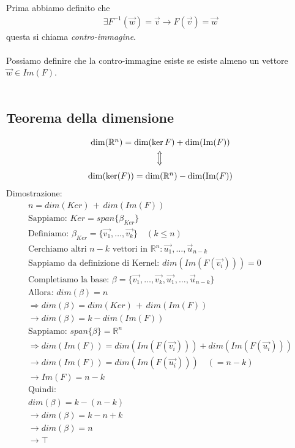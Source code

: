 \documentclass[10pt]{extarticle}
\begin{document}
Prima abbiamo definito che 
\begin{align*}
    \exists F^{-1}(\vec{w})=\vec{v} \to F(\vec{v})=\vec{w}
\end{align*}
questa si chiama \textit{contro-immagine}. \\
\vspace{1em} \\
Possiamo definire che la contro-immagine esiste se esiste almeno un vettore $\vec{w} \in Im(F)$. \\
\vspace{15em}\\
\subsection{Teorema della dimensione}
\[
\begin{array}{c}
    \dim(\mathbb{R}^n) = \dim(\ker F) + \dim(\operatorname{Im} (F)) \\
    \rotatebox{90}{$\iff$} \\
    \dim(\ker (F)) = \dim(\mathbb{R}^n) - \dim(\operatorname{Im} (F))
\end{array}
\]
Dimostrazione:
\begin{align*}
    n=dim(Ker) \, + \, dim(Im(F)) \\
    \text{Sappiamo: } Ker=span\{\beta_{Ker}\} \\
    \text{Definiamo: } \beta_{Ker}=\{\vec{v_1},\dots,\vec{v_k}\} \quad (k \leq n) \\
    \text{Cerchiamo altri $n-k$ vettori in $\mathbb{R}^n$}: \vec{u_1},\dots,\vec{u}_{n-k} \\
    \text{Sappiamo da definizione di Kernel: } dim(Im(F(\vec{v_i})))=0 \\
    \text{Completiamo la base: } \beta=\{\vec{v_1},\dots,\vec{v_k},\vec{u_1},\dots,\vec{u}_{n-k}\} \\
    \text{Allora: } dim(\beta)=n \\
    \Rightarrow dim(\beta)=dim(Ker) \, + \, dim(Im(F)) \\
    \to dim(\beta)=k-dim(Im(F)) \\ 
    \text{Sappiamo: } span\{\beta\}=\mathbb{R}^n \\
    \Rightarrow dim(Im(F))=dim(Im(F(\vec{v_i})))+dim(Im(F(\vec{u_i}))) \\
    \to dim(Im(F))=dim(Im(F(\vec{u_i}))) \quad (=n-k)\\  
    \to Im(F)=n-k \\
    \text{Quindi: } \\
    dim(\beta)=k-(n-k) \\ 
    \to dim(\beta)=k-n+k \\ 
    \to dim(\beta)=n \\
    \to \top \\ 
\end{align*}
\end{document}
